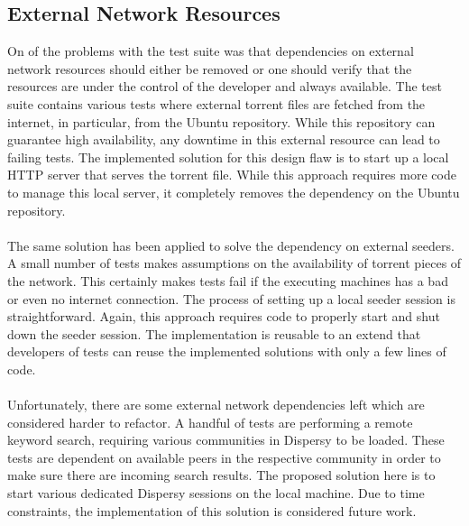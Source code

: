 \subsection{External Network Resources}
\label{subsec:external-network-resources}
On of the problems with the test suite was that dependencies on external network resources should either be removed or one should verify that the resources are under the control of the developer and always available. The test suite contains various tests where external torrent files are fetched from the internet, in particular, from the Ubuntu repository. While this repository can guarantee high availability, any downtime in this external resource can lead to failing tests. The implemented solution for this design flaw is to start up a local HTTP server that serves the torrent file. While this approach requires more code to manage this local server, it completely removes the dependency on the Ubuntu repository.\\\\
The same solution has been applied to solve the dependency on external seeders. A small number of tests makes assumptions on the availability of torrent pieces of the network. This certainly makes tests fail if the executing machines has a bad or even no internet connection. The process of setting up a local seeder session is straightforward. Again, this approach requires code to properly start and shut down the seeder session. The implementation is reusable to an extend that developers of tests can reuse the implemented solutions with only a few lines of code.\\\\
Unfortunately, there are some external network dependencies left which are considered harder to refactor. A handful of tests are performing a remote keyword search, requiring various communities in Dispersy to be loaded. These tests are dependent on available peers in the respective community in order to make sure there are incoming search results. The proposed solution here is to start various dedicated Dispersy sessions on the local machine. Due to time constraints, the implementation of this solution is considered future work.

